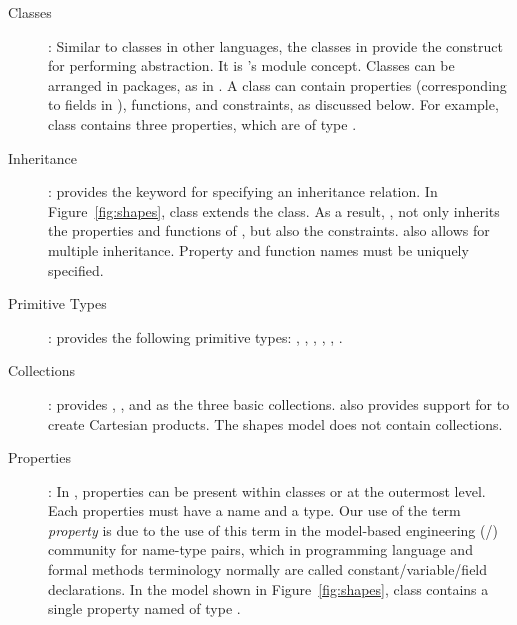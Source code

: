 \begin{description}

\item [Classes]: Similar to classes in other languages, the classes in
  \Klang{} provide the construct for performing abstraction. It is \Klang{}'s
   module concept. Classes can be arranged in packages, as in \java.
   A class can contain properties (corresponding to fields in \java), functions, 
   and constraints, as discussed below. For example, class  
   contains three properties, which are of type .

\item [Inheritance]: \Klang{} provides the  keyword for
  specifying an inheritance relation. In Figure~\ref{fig:shapes},
   class extends the  class. As a result,
  , not only inherits the properties and functions of
  , but also the constraints. \Klang{} also allows for
  multiple inheritance. Property and function names must be uniquely
  specified.

\item [Primitive Types]: \Klang{} provides the following primitive
  types: , , , ,
  , .

\item [Collections]: \Klang{} provides , , and
   as the three basic collections. \Klang{} also provides
  support for  to create Cartesian products. The shapes model
  does not contain collections.

\item [Properties]: In \Klang{}, properties can be present within
  classes or at the outermost level. Each properties must have a name
  and a type. Our use of the term {\em property} is due to the use of this term
  in the model-based engineering (\uml/\sysml) community for name-type pairs,
  which in programming language and formal methods terminology normally are called
  constant/variable/field declarations.
  In the model shown in Figure~\ref{fig:shapes}, class
   contains a single property named  of type
  .


\end{description}
